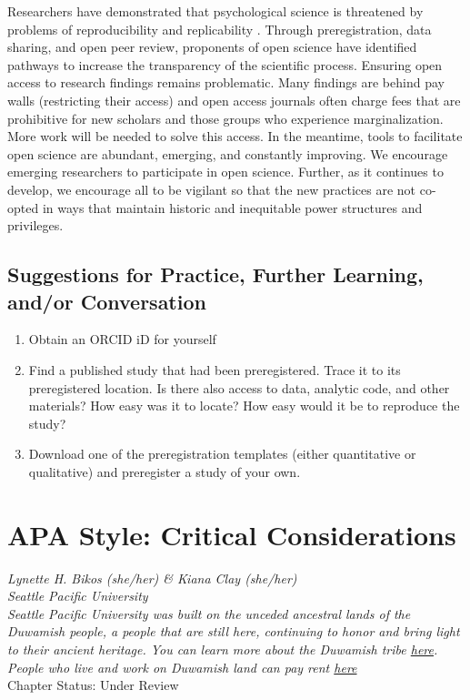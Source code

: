 \documentclass[
  11pt,
]{book}
\providecommand{\tightlist}{%
  \setlength{\itemsep}{0pt}\setlength{\parskip}{0pt}}
\begin{document}
Researchers have demonstrated that psychological science is threatened by problems of reproducibility and replicability \citep{open_science_collaboration_estimating_2015}. Through preregistration, data sharing, and open peer review, proponents of open science have identified pathways to increase the transparency of the scientific process. Ensuring open access to research findings remains problematic. Many findings are behind pay walls (restricting their access) and open access journals often charge fees that are prohibitive for new scholars and those groups who experience marginalization. More work will be needed to solve this access. In the meantime, tools to facilitate open science are abundant, emerging, and constantly improving. We encourage emerging researchers to participate in open science. Further, as it continues to develop, we encourage all to be vigilant so that the new practices are not co-opted in ways that maintain historic and inequitable power structures and privileges.

\hypertarget{suggestions-for-practice-further-learning-andor-conversation}{%
\section{Suggestions for Practice, Further Learning, and/or Conversation}\label{suggestions-for-practice-further-learning-andor-conversation}}

\begin{enumerate}
\def\labelenumi{\arabic{enumi}.}
\tightlist
\item
  Obtain an ORCID iD for yourself
\item
  Find a published study that had been preregistered. Trace it to its preregistered location. Is there also access to data, analytic code, and other materials? How easy was it to locate? How easy would it be to reproduce the study?
\item
  Download one of the preregistration templates (either quantitative or qualitative) and preregister a study of your own.
\end{enumerate}

\hypertarget{APAstyle}{%
\chapter{APA Style: Critical Considerations}\label{APAstyle}}

\emph{Lynette H. Bikos (she/her) \& Kiana Clay (she/her)}\\
\emph{Seattle Pacific University}\\
\emph{Seattle Pacific University was built on the unceded ancestral lands of the Duwamish people, a people that are still here, continuing to honor and bring light to their ancient heritage. You can learn more about the Duwamish tribe \href{https://www.duwamishtribe.org/}{here}. People who live and work on Duwamish land can pay rent \href{https://www.realrentduwamish.org/}{here}}\\
Chapter Status: Under Review
\end{document}
